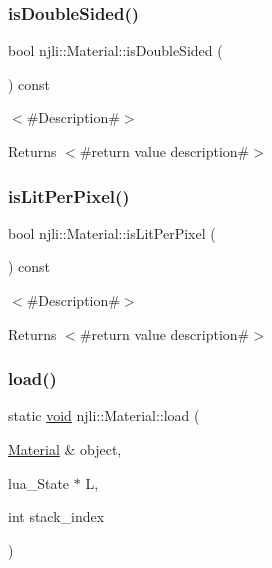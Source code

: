 \subsubsection{\texorpdfstring{is\+Double\+Sided()}{isDoubleSided()}}
{\footnotesize\ttfamily bool njli\+::\+Material\+::is\+Double\+Sided (\begin{DoxyParamCaption}{ }\end{DoxyParamCaption}) const}

$<$\#\+Description\#$>$

\begin{DoxyReturn}{Returns}
$<$\#return value description\#$>$ 
\end{DoxyReturn}
\mbox{\label{classnjli_1_1_material_ad21ee1c7e0de8c532f3bd8bf0314d5d1}} 
\subsubsection{\texorpdfstring{is\+Lit\+Per\+Pixel()}{isLitPerPixel()}}
{\footnotesize\ttfamily bool njli\+::\+Material\+::is\+Lit\+Per\+Pixel (\begin{DoxyParamCaption}{ }\end{DoxyParamCaption}) const}

$<$\#\+Description\#$>$

\begin{DoxyReturn}{Returns}
$<$\#return value description\#$>$ 
\end{DoxyReturn}
\mbox{\label{classnjli_1_1_material_acbf12f3b3abb3f7ea02d9bc2acfb8028}} 
\subsubsection{\texorpdfstring{load()}{load()}}
{\footnotesize\ttfamily static \mbox{\hyperlink{_thread_8h_af1e856da2e658414cb2456cb6f7ebc66}{void}} njli\+::\+Material\+::load (\begin{DoxyParamCaption}\item[{\mbox{\hyperlink{classnjli_1_1_material}{Material}} \&}]{object,  }\item[{lua\+\_\+\+State $\ast$}]{L,  }\item[{int}]{stack\+\_\+index }\end{DoxyParamCaption})\hspace{0.3cm}{\ttfamily [static]}}

